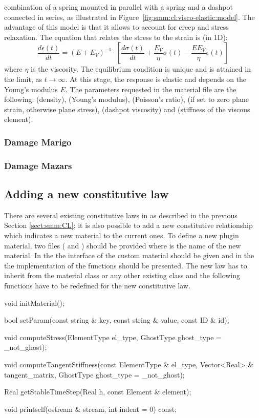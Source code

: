 combination of a spring mounted in parallel with a spring and a dashpot
connected in series, as illustrated in
Figure~\ref{fig:smm:cl:visco-elastic:model}. The advantage of this model is that
it allows to account for creep and stress relaxation. The equation that relates
the stress to the strain is (in 1D):
\begin{equation}
  \frac{d\epsilon(t)}{dt} = \left ( E + E_V \right ) ^ {-1} \cdot \left [ \frac{d\sigma(t)}{dt} + \frac{E_V}{\eta}\sigma(t) - \frac{EE_V}{\eta}\epsilon(t) \right ]
\end{equation}
where $\eta$ is the viscosity. The equilibrium condition is unique and is
attained in the limit, as $t \to \infty $. At this stage, the response is
elastic and depends on the Young's modulus $E$.  The parameters requested in the
material file are the following:  (density),  (Young's
modulus),  (Poisson's ratio),  (if set to zero
plane strain, otherwise plane stress),  (dashpot viscosity) and
 (stiffness of the viscous element).

\subsubsection{Damage Marigo}
\subsubsection{Damage Mazars}

\subsection{Adding a new constitutive law}


There are several existing constitutive laws in \akantu as described in the
previous Section \ref{sect:smm:CL}; it is also possible to add a new
constitutive relationship which indicates a new material to the current ones. To
define a new plugin material, two files ( and
) should be provided where  is the name of the
new material. In the  the interface of the custom
material should be given and in the  the implementation
of the functions should be presented.  The new law has to inherit from the
material class or any other existing  class and the following
functions have to be redefined for the new constitutive law.

\begin{cpp}
  void initMaterial();

  bool setParam(const string & key, const string & value,
  const ID & id);

  void computeStress(ElementType el_type, GhostType ghost_type = _not_ghost);

  void computeTangentStiffness(const ElementType & el_type,
  Vector<Real> & tangent_matrix,
  GhostType ghost_type = _not_ghost);

  Real getStableTimeStep(Real h, const Element & element);

  void printself(ostream & stream, int indent = 0) const;
\end{cpp}


